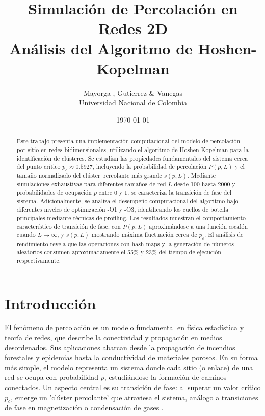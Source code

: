 \documentclass[12pt,a4paper]{article}
\title{Simulación de Percolación en Redes 2D\\
       Análisis del Algoritmo de Hoshen-Kopelman}
\author{Mayorga , Gutierrez \& Vanegas\\
        Universidad Nacional de Colombia}
\date{\today}
\begin{document}
\maketitle

\begin{abstract}
Este trabajo presenta una implementación computacional del modelo de percolación por sitio en redes bidimensionales, utilizando el algoritmo de Hoshen-Kopelman para la identificación de clústeres. Se estudian las propiedades fundamentales del sistema cerca del punto crítico $p_c \approx 0.5927$, incluyendo la probabilidad de percolación $P(p,L)$ y el tamaño normalizado del clúster percolante más grande $s(p,L)$. Mediante simulaciones exhaustivas para diferentes tamaños de red $L$ desde 100 hasta 2000 y probabilidades de ocupación $p$ entre 0 y 1, se caracteriza la transición de fase del sistema. Adicionalmente, se analiza el desempeño computacional del algoritmo bajo diferentes niveles de optimización -O1 y -O3, identificando los cuellos de botella principales mediante técnicas de profiling. Los resultados muestran el comportamiento característico de transición de fase, con $P(p,L)$ aproximándose a una función escalón cuando $L \rightarrow \infty$, y $s(p,L)$ mostrando máxima fluctuación cerca de $p_c$. El análisis de rendimiento revela que las operaciones con hash maps y la generación de números aleatorios consumen aproximadamente el 55\% y 23\% del tiempo de ejecución respectivamente.
\end{abstract}

\section{Introducción}

El fenómeno de percolación es un modelo fundamental en física estadística y teoría de redes, que describe la conectividad y propagación en medios desordenados. Sus aplicaciones abarcan desde la propagación de incendios forestales y epidemias hasta la conductividad de materiales porosos. En su forma más simple, el modelo representa un sistema donde cada sitio (o enlace) de una red se ocupa con probabilidad \( p \), estudiándose la formación de caminos conectados. Un aspecto central es su transición de fase: al superar un valor crítico \( p_c \), emerge un 'clúster percolante' que atraviesa el sistema, análogo a transiciones de fase en magnetización o condensación de gases \cite{CantabranaBarrio2018, PERCentralPercolation}.
\\
\end{document}
